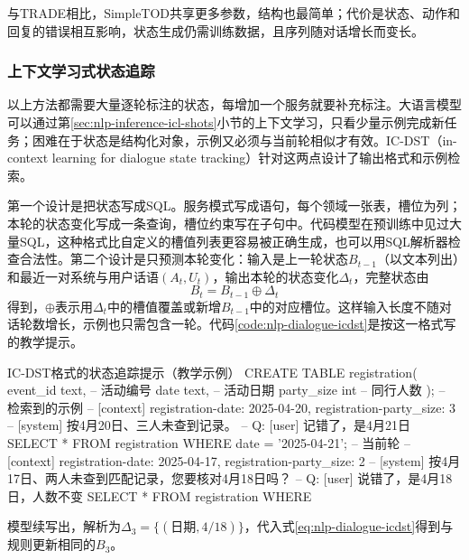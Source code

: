 与TRADE相比，SimpleTOD共享更多参数，结构也最简单；代价是状态、动作和回复的错误相互影响，状态生成仍需训练数据，且序列随对话增长而变长。

\subsubsection{上下文学习式状态追踪}
\label{sec:nlp-dialogue-icdst}

以上方法都需要大量逐轮标注的状态，每增加一个服务就要补充标注。大语言模型可以通过第\ref{sec:nlp-inference-icl-shots}小节的上下文学习，只看少量示例完成新任务；困难在于状态是结构化对象，示例又必须与当前轮相似才有效。IC-DST（in-context learning for dialogue state tracking）针对这两点设计了输出格式和示例检索。

第一个设计是把状态写成SQL。服务模式写成语句，每个领域一张表，槽位为列；本轮的状态变化写成一条查询，槽位约束写在子句中。代码模型在预训练中见过大量SQL，这种格式比自定义的槽值列表更容易被正确生成，也可以用SQL解析器检查合法性。第二个设计是只预测本轮变化：输入是上一轮状态$B_{t-1}$（以文本列出）和最近一对系统与用户话语$(A_t,U_t)$，输出本轮的状态变化$\Delta_t$，完整状态由
\begin{equation}
 B_t=B_{t-1}\oplus\Delta_t
 \label{eq:nlp-dialogue-icdst}
\end{equation}
得到，$\oplus$表示用$\Delta_t$中的槽值覆盖或新增$B_{t-1}$中的对应槽位。这样输入长度不随对话轮数增长，示例也只需包含一轮。代码\ref{code:nlp-dialogue-icdst}是按这一格式写的教学提示。

\begin{codeblock}[language=SQL,label={code:nlp-dialogue-icdst}]{IC-DST格式的状态追踪提示（教学示例）}
CREATE TABLE registration(
  event_id text,   -- 活动编号
  date text,       -- 活动日期
  party_size int   -- 同行人数
);
-- 检索到的示例
-- [context] registration-date: 2025-04-20, registration-party_size: 3
-- [system] 按4月20日、三人未查到记录。
-- Q: [user] 记错了，是4月21日
SELECT * FROM registration WHERE date = '2025-04-21';
-- 当前轮
-- [context] registration-date: 2025-04-17, registration-party_size: 2
-- [system] 按4月17日、两人未查到匹配记录，您要核对4月18日吗？
-- Q: [user] 说错了，是4月18日，人数不变
SELECT * FROM registration WHERE
\end{codeblock}

模型续写出，解析为$\Delta_3=\{(\text{日期},4/18)\}$，代入式\eqref{eq:nlp-dialogue-icdst}得到与规则更新相同的$B_3$。

